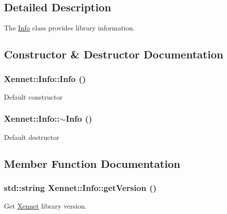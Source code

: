 \subsection{Detailed Description}
The \hyperlink{classXennet_1_1Info}{Info} class provides library information. 

\subsection{Constructor \& Destructor Documentation}
\hypertarget{classXennet_1_1Info_f5528bca74d99b1b5ae7ca1c12be5ea6}{
\subsubsection{\setlength{\rightskip}{0pt plus 5cm}Xennet::Info::Info ()}}
\label{classXennet_1_1Info_f5528bca74d99b1b5ae7ca1c12be5ea6}


Default constructor \hypertarget{classXennet_1_1Info_9e8105b185d36f9474da4f1073aa86fb}{
\subsubsection{\setlength{\rightskip}{0pt plus 5cm}Xennet::Info::$\sim$Info ()}}
\label{classXennet_1_1Info_9e8105b185d36f9474da4f1073aa86fb}


Default destructor 

\subsection{Member Function Documentation}
\hypertarget{classXennet_1_1Info_180a53770171a6e9a799cce43fb29162}{
\subsubsection{\setlength{\rightskip}{0pt plus 5cm}std::string Xennet::Info::getVersion ()}}
\label{classXennet_1_1Info_180a53770171a6e9a799cce43fb29162}


Get \hyperlink{namespaceXennet}{Xennet} library version. 

